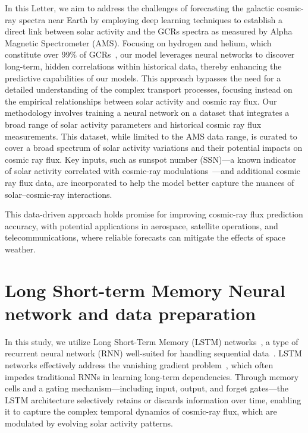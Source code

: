 \documentclass[twocolumn,,12pt]{aastex631}
\begin{document}
In this Letter, we aim to address the challenges of forecasting the galactic cosmic-ray spectra near Earth by employing deep learning techniques to establish a direct link between solar activity and the GCRs spectra as measured by Alpha Magnetic Spectrometer (AMS). Focusing on hydrogen and helium, which constitute over 99\% of GCRs~\cite{simpson1983elemental,gaisser1982cosmic}, our model leverages neural networks to discover long-term, hidden correlations within historical data, thereby enhancing the predictive capabilities of our models. This approach bypasses the need for a detailed understanding of the complex transport processes, focusing instead on the empirical relationships between solar activity and cosmic ray flux. Our methodology involves training a neural network on a dataset that integrates a broad range of solar activity parameters and historical cosmic ray flux measurements. This dataset, while limited to the AMS data range, is curated to cover a broad spectrum of solar activity variations and their potential impacts on cosmic ray flux. Key inputs, such as sunspot number (SSN)—a known indicator of solar activity correlated with cosmic-ray modulations~\cite{forbush1954world,forbush1958cosmic,cliver2001coronal,mishra2006cosmic,ross2019behaviour,koldobskiy2022time}—and additional cosmic ray flux data, are incorporated to help the model better capture the nuances of solar--cosmic-ray interactions.


This data-driven approach holds promise for improving cosmic-ray flux prediction accuracy, with potential applications in aerospace, satellite operations, and telecommunications, where reliable forecasts can mitigate the effects of space weather.


\section{Long Short-term Memory Neural network and data preparation}
\label{sec:LSTM}
In this study, we utilize Long Short-Term Memory (LSTM) networks~\cite{hochreiter1997long}, a type of recurrent neural network (RNN) well-suited for handling sequential data~\cite{hua2019deep,tealab2018time,sak2014long}. LSTM networks effectively address the vanishing gradient problem~\cite{basodi2020gradient}, which often impedes traditional RNNs in learning long-term dependencies. Through memory cells and a gating mechanism—including input, output, and forget gates—the LSTM architecture selectively retains or discards information over time, enabling it to capture the complex temporal dynamics of cosmic-ray flux, which are modulated by evolving solar activity patterns.
\end{document}
